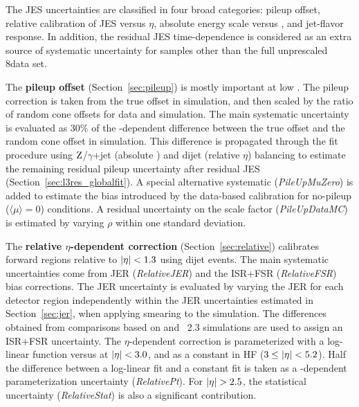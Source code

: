 \documentclass[11pt,twoside,a4paper,cmspaper,final,collab]{cms-tdr}
\begin{document}
The JES uncertainties are classified in four broad categories: pileup offset, relative calibration of JES versus $\eta$, absolute energy scale versus \pt, and jet-flavor response. In addition, the residual JES time-dependence is considered as an extra source of systematic uncertainty for samples other than the full unprescaled 8\TeV data set.

The \textbf{pileup offset} (Section~\ref{sec:pileup}) is mostly important at low \pt. The pileup correction is taken from the true offset in simulation, and then scaled by the ratio of random cone offsets for data and simulation. The main systematic uncertainty is evaluated as $30\%$ of the \pt-dependent difference between the true offset and the random cone offset in simulation.
This difference is propagated through the fit procedure using $\mathrm{Z}$/$\gamma$+jet (absolute \pt) and dijet (relative $\eta$)  balancing to estimate the remaining residual pileup uncertainty after residual JES (Section~\ref{sec:l3res_globalfit}).
A special alternative systematic (\textit{PileUpMuZero}) is added to estimate the bias introduced by the data-based calibration for no-pileup ($\langle\mu\rangle=0$) conditions.
A residual uncertainty on the scale factor (\textit{PileUpDataMC}) is estimated by  varying $\rho$ within one standard deviation.

The \textbf{relative $\eta$-dependent correction} (Section~\ref{sec:relative}) calibrates forward regions relative to $\lvert \eta \rvert<1.3$ using dijet events. The main systematic uncertainties come from JER (\textit{RelativeJER}) and the ISR+FSR (\textit{RelativeFSR}) bias corrections. The JER uncertainty is evaluated by varying the JER for each detector region independently within the JER uncertainties estimated in Section~\ref{sec:jer}, when applying smearing to the simulation.
The differences obtained from comparisons based on  and \HERWIGpp~2.3 simulations are used to assign an ISR+FSR uncertainty.
The $\eta$-dependent correction is parameterized with a log-linear function versus \pt at $\lvert \eta \rvert<3.0$, and as a constant in HF ($3\leq\lvert \eta \rvert<5.2$).
Half the difference between a log-linear fit and a constant fit is taken as a \pt-dependent parameterization uncertainty (\textit{RelativePt}).
For $\lvert \eta \rvert>2.5$, the statistical uncertainty (\textit{RelativeStat}) is also a significant contribution.
\end{document}
